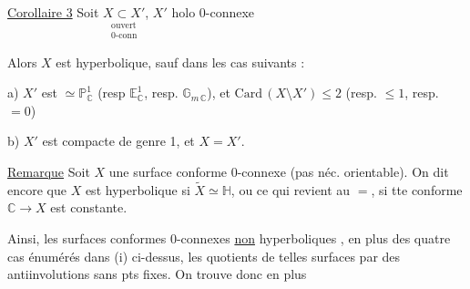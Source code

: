 
\uline{Corollaire 3} Soit $\underset{\substack{\text{ouvert}\\\text{0-conn}}}{X\subset X'}$, $X'$ holo $0$-connexe

Alors $X$ est hyperbolique, sauf dans les cas suivants :

a) $X'$ est $\simeq\mathbb P^1_{\mathbb C}$ (resp $\mathbb E^1_{\mathbb C}$, resp. $\mathbb G_{m\,\mathbb C}$), et $\mathrm{Card}\,(X\setminus X')\leq 2$ (resp. $\leq 1$, resp. $=0$)

b) $X'$ est compacte de genre 1, et $X=X'$.

\uline{Remarque} Soit  $X$ une surface conforme $0$-connexe (pas néc. orientable). On dit encore que $X$ est hyperbolique si $\widetilde X\simeq\mathbb H$, ou ce qui revient au $=$, si tte  conforme $\mathbb C\longrightarrow X$ est constante.


Ainsi, les surfaces conformes  $0$-connexes \uline{non} hyperboliques , en plus des quatre cas énumérés dans (i) ci-dessus, les quotients de telles surfaces par des antiinvolutions sans pts fixes. On trouve donc en plus

